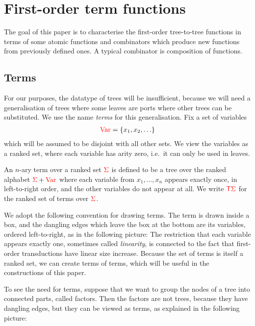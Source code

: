 \section{First-order term functions}
The goal of this paper is to characterise the first-order tree-to-tree functions in terms of some atomic functions and combinators which produce new functions from previously defined ones. A typical combinator is composition of functions.

\subsection{Terms}
For our purposes, the datatype of trees will be insufficient, because  we will need a generalisation of trees where some leaves  are ports   where other trees can be substituted. We use the name \emph{terms} for this generalisation. Fix a set of variables
\begin{align*}
    {{\color{red}{\mathrm{Var}}}} = \{x_1,x_2,\ldots\}
\end{align*}
which will be assumed to be disjoint with all other sets.  We view the variables as a ranked set, where each variable has arity zero, i.e.~it can only be used in leaves. 

\begin{definition}[Terms]\label{def:terms}
    An $n$-ary term over a ranked set ${\color{red}{\Sigma}}$ is defined to be a tree over the ranked alphabet ${\color{red}{\Sigma}} + {{\color{red}{\mathrm{Var}}}}$ where each variable from $x_1,\ldots,x_n$ appears exactly once, in left-to-right order,  and the other variables do not appear at all.    We write ${\color{red}{\mathsf T}} {\color{red}{\Sigma}}$ for the ranked set of terms over ${\color{red}{\Sigma}}$. 
\end{definition}

We adopt the following convention for drawing terms. The term is drawn inside a box, and the dangling edges which leave the box at the bottom are its variables, ordered left-to-right, as in the following picture: 
 The restriction that each variable appears exactly one, sometimes called \emph{linearity}, is connected to the fact that first-order transductions have linear size increase. Because the set of terms is itself a ranked set,  we can create terms of terms, which will be useful in the constructions of this paper. 

To see the need for terms, suppose that we want to group the nodes of a tree into connected parts, called factors. Then the factors are not trees, because they have dangling edges, but they can be viewed as terms, as explained in the following picture:
        
